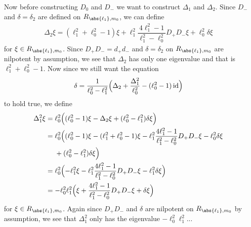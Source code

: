 Now before constructing $D_0$ and $D_-$ we want to construct $\Delta_1$ and $\Delta_2$. Since $D_-$ and $\delta=\delta_2$ are defined on $R_{\abs{\ell_1},m_0}$, we can define
\begin{align*}
  \Delta_2\xi = (\ell_1^2+\ell_0^2-1)\xi + \ell_1^2\dfrac{4\ell_1^2-1}{\ell_1^2-\ell_0^2} D_+D_-\xi + \ell_0^2\delta\xi
\end{align*}
for $\xi \in R_{\abs{\ell_1},m_0}$. Since $D_+D_-=d_+d_-$ and $\delta=\delta_2$ on $R_{\abs{\ell_1},m_0}$ are nilpotent by assumption, we see that $\Delta_2$ has only one eigenvalue and that is $\ell_1^2+\ell_0^2-1$. Now since we still want the equation
\begin{align*}
  \delta = \dfrac{1}{\ell_0^2-\ell_1^2}\Bigl( \Delta_2 + \dfrac{\Delta_1^2}{\ell_0^2} - (\ell_0^2-1)\operatorname{id} \Bigr)
\end{align*}
to hold true, we define
\begin{align*}
  \Delta_1^2\xi &= \ell_0^2\Bigl( (\ell_0^2-1)\xi - \Delta_2\xi + (\ell_0^2-\ell_1^2)\delta\xi   \Bigr) \\
         &= \ell_0^2\Bigl( (\ell_0^2-1)\xi - (\ell_1^2+\ell_0^2-1)\xi - \ell_1^2\dfrac{4\ell_1^2-1}{\ell_1^2-\ell_0^2} D_+D_- \xi - \ell_0^2\delta \xi \\*
         &\phantom{{}={}}{} + (\ell_0^2-\ell_1^2)\delta\xi   \Bigr) \\
         &= \ell_0^2\Bigl( -\ell_1^2 \xi - \ell_1^2\dfrac{4\ell_1^2-1}{\ell_1^2-\ell_0^2} D_+D_- \xi - \ell_1^2\delta\xi \Bigr)\\
         &= -\ell_0^2\ell_1^2\Bigl( \xi + \dfrac{4\ell_1^2-1}{\ell_1^2-\ell_0^2} D_+D_- \xi + \delta\xi \Bigr)
\end{align*}
for $\xi \in R_{\abs{\ell_1},m_0}$. Again since $D_+D_-$ and $\delta$ are nilpotent on $R_{\abs{\ell_1},m_0}$ by assumption, we see that $\Delta_1^2$ only has the eigenvalue $-\ell_0^2\ell_1^2$...



